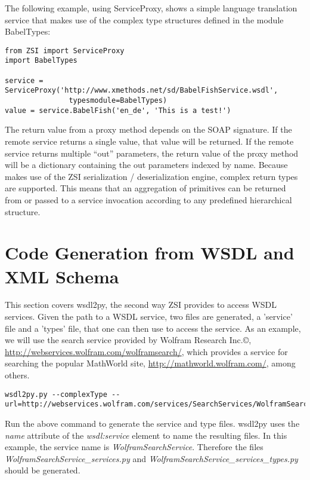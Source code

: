 The following example, using ServiceProxy,  shows a simple language
translation service that makes
use of the complex type structures defined in the module BabelTypes:

\begin{verbatim}
from ZSI import ServiceProxy
import BabelTypes

service = ServiceProxy('http://www.xmethods.net/sd/BabelFishService.wsdl',
		       typesmodule=BabelTypes)
value = service.BabelFish('en_de', 'This is a test!')
\end{verbatim}

The return value from a proxy method depends on the SOAP signature. If the 
remote service returns a single value, that value will be returned. If the 
remote service returns multiple ``out'' parameters, the return value of the 
proxy method will be a dictionary containing the out parameters indexed by 
name.  Because  makes use of the ZSI serialization / 
deserialization engine, complex return types are supported.  This means 
that an aggregation of primitives can be returned from or passed to a service
invocation according to any predefined hierarchical structure.


\section{Code Generation from WSDL and XML Schema}

This section covers wsdl2py, the second way ZSI provides to access WSDL
services.  Given the path to a WSDL service, two files are generated, a 
'service' file and a 'types' file, that one can then use to access the
service.  As an example, we will use the search service provided by Wolfram
Research Inc.\copyright{}, \url{http://webservices.wolfram.com/wolframsearch/}, 
which provides a service for searching the popular MathWorld site, 
\url{http://mathworld.wolfram.com/}, among others.

\begin{verbatim}
wsdl2py.py --complexType --url=http://webservices.wolfram.com/services/SearchServices/WolframSearch2.wsdl
\end{verbatim}

Run the above command to generate the service and type files.  wsdl2py uses
the {\it name} attribute of the {\it wsdl:service} element to name the resulting files.
In this example, the service name is {\it WolframSearchService}.  Therefore the files
{\it WolframSearchService_services.py} and {\it WolframSearchService_services_types.py}
should be generated.

